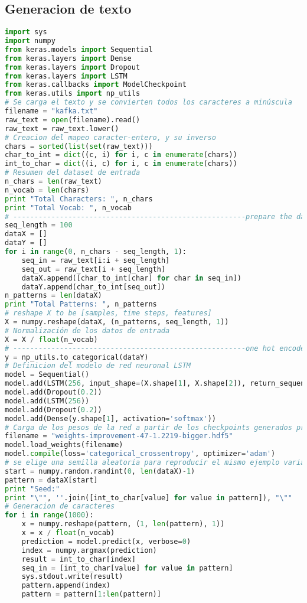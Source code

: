 \subsection{Generacion de texto}
\begin{lstlisting}[language=Python]
import sys
import numpy
from keras.models import Sequential
from keras.layers import Dense
from keras.layers import Dropout
from keras.layers import LSTM
from keras.callbacks import ModelCheckpoint
from keras.utils import np_utils
# Se carga el texto y se convierten todos los caracteres a minúscula
filename = "kafka.txt"
raw_text = open(filename).read()
raw_text = raw_text.lower()
# Creacion del mapeo caracter-entero, y su inverso
chars = sorted(list(set(raw_text)))
char_to_int = dict((c, i) for i, c in enumerate(chars))
int_to_char = dict((i, c) for i, c in enumerate(chars))
# Resumen del dataset de entrada
n_chars = len(raw_text)
n_vocab = len(chars)
print "Total Characters: ", n_chars
print "Total Vocab: ", n_vocab
# -------------------------------------------------------prepare the dataset of input to output pairs encoded as integers
seq_length = 100
dataX = []
dataY = []
for i in range(0, n_chars - seq_length, 1):
	seq_in = raw_text[i:i + seq_length]
	seq_out = raw_text[i + seq_length]
	dataX.append([char_to_int[char] for char in seq_in])
	dataY.append(char_to_int[seq_out])
n_patterns = len(dataX)
print "Total Patterns: ", n_patterns
# reshape X to be [samples, time steps, features]
X = numpy.reshape(dataX, (n_patterns, seq_length, 1))
# Normalización de los datos de entrada
X = X / float(n_vocab)
# -------------------------------------------------------one hot encode the output variable
y = np_utils.to_categorical(dataY)
# Definicion del modelo de red neuronal LSTM
model = Sequential()
model.add(LSTM(256, input_shape=(X.shape[1], X.shape[2]), return_sequences=True))
model.add(Dropout(0.2))
model.add(LSTM(256))
model.add(Dropout(0.2))
model.add(Dense(y.shape[1], activation='softmax'))
# Carga de los pesos de la red a partir de los checkpoints generados previamente
filename = "weights-improvement-47-1.2219-bigger.hdf5"
model.load_weights(filename)
model.compile(loss='categorical_crossentropy', optimizer='adam')
# se elige una semilla aleatoria para reproducir el mismo ejemplo varias veces
start = numpy.random.randint(0, len(dataX)-1)
pattern = dataX[start]
print "Seed:"
print "\"", ''.join([int_to_char[value] for value in pattern]), "\""
# Generacion de caracteres
for i in range(1000):
	x = numpy.reshape(pattern, (1, len(pattern), 1))
	x = x / float(n_vocab)
	prediction = model.predict(x, verbose=0)
	index = numpy.argmax(prediction)
	result = int_to_char[index]
	seq_in = [int_to_char[value] for value in pattern]
	sys.stdout.write(result)
	pattern.append(index)
	pattern = pattern[1:len(pattern)]
\end{lstlisting}

\newpage \thispagestyle{empty} %
